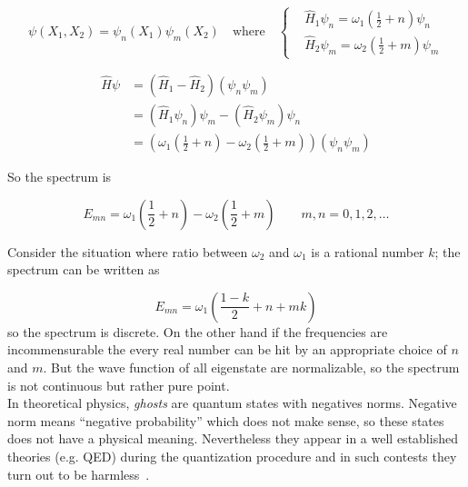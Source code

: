 \begin{equation*}
  \psi(X_1, X_2) = \psi_n(X_1) \psi_m(X_2)
  \quad \text{where} \quad
  \begin{cases}
    &\hat{H}_1\psi_n = \omega_1 \left( \frac{1}{2} + n \right)\psi_n \\
    &\hat{H}_2\psi_m = \omega_2 \left( \frac{1}{2} + m \right)\psi_m
  \end{cases}
\end{equation*}

\begin{align*}
  \hat{H} \psi
  &= \left(\hat{H}_1 - \hat{H}_2\right) \left(\psi_n \psi_m\right) \\
  &= \left(\hat{H}_1\psi_n\right)\psi_m - \left(\hat{H}_2\psi_m\right)\psi_n \\
  &= \left(
    \omega_1\left(\frac{1}{2} + n\right) -
    \omega_2\left(\frac{1}{2} + m\right)
     \right) \left(\psi_n\psi_m\right)
\end{align*}



So the spectrum is

\begin{equation}
  E_{mn} =
  \omega_1 \left( \frac{1}{2} + n \right) -
  \omega_2 \left( \frac{1}{2} + m \right)
  \qquad m,n = 0,1,2,\ldots
\end{equation}

Consider the situation where ratio between $\omega_2$ and $\omega_1$ is a
rational number $k$; the spectrum can be written as

\begin{equation*}
  E_{mn} = \omega_1 \left( \frac{1-k}{2} + n + mk \right)
\end{equation*}
so the spectrum is discrete. On the other hand if the frequencies are
incommensurable the every real number can be hit by an appropriate choice of
$n$ and $m$. But the wave function of all eigenstate are normalizable, so the
spectrum is not continuous but rather pure point. \\

In theoretical physics, \emph{ghosts} are quantum states with negatives norms.
Negative norm means ``negative probability'' which does not make sense, so
these states does not have a physical meaning. Nevertheless they appear in a
well established theories (e.g. QED) during the quantization procedure and in
such contests they turn out to be harmless~\cite{Smilga01}.

